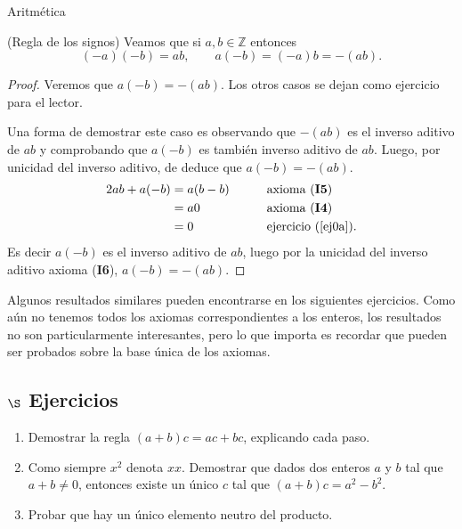 \begin{section}{Aritmética}
\begin{ejemplo} (Regla de los signos) Veamos que  si $a,b \in \mathbb Z$ entonces
$$
(-a)(-b) = ab ,\qquad a(-b) = (-a)b = -(ab).
$$
\end{ejemplo}
\begin{proof}
Veremos que  $a(-b) = -(ab)$. Los otros casos se dejan como ejercicio para el lector.

Una forma de demostrar este caso es  observando que $-(ab)$ es el inverso aditivo de $ab$ y comprobando que $a(-b)$ es también inverso aditivo de $ab$. Luego, por unicidad del inverso aditivo, de deduce que $a(-b) = -(ab)$. 
\begin{alignat*}2
ab + a(-b) &=a(b-b) &\qquad &\text{axioma ({\bf I5})} \\
&=a0 &\qquad &\text{axioma ({\bf I4})}\\
&= 0 &\qquad &\text{ejercicio (\ref{ej0a})}.
\end{alignat*}
Es decir $a(-b)$ es el inverso aditivo de $ab$, luego por la unicidad del inverso aditivo axioma ({\bf I6}), $a(-b)=-(ab)$.
\end{proof}


Algunos resultados similares pueden encontrarse en los siguientes ejercicios. Como aún no tenemos todos los axiomas correspondientes a los enteros, los resultados no son particularmente interesantes, pero lo que importa es recordar que pueden ser probados sobre la base única de los axiomas.

\subsection*{\Large $\S$ Ejercicios}

\begin{enumerate}[1)]
\item Demostrar la regla $(a+b)c=ac+bc$, explicando cada paso.

\item Como siempre $x^2$ denota $xx$. Demostrar que dados dos enteros $a$ y $b$ tal que $a+b \not=0$, entonces existe un único $c$ tal que $(a+b)c=
a^2 - b^2$.

\item Probar que hay un único elemento neutro del producto.


\end{enumerate}
\end{section}
